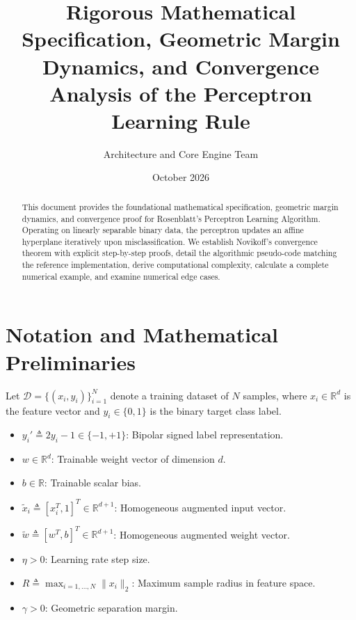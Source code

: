 \documentclass[11pt,a4paper]{article}
\title{\textbf{Rigorous Mathematical Specification, Geometric Margin Dynamics, and Convergence Analysis of the Perceptron Learning Rule}}
\author{Architecture and Core Engine Team}
\date{October 2026}
\theoremstyle{definition}
\begin{document}
\maketitle

\begin{abstract}
This document provides the foundational mathematical specification, geometric margin dynamics, and convergence proof for Rosenblatt's Perceptron Learning Algorithm. Operating on linearly separable binary data, the perceptron updates an affine hyperplane iteratively upon misclassification. We establish Novikoff's convergence theorem with explicit step-by-step proofs, detail the algorithmic pseudo-code matching the reference implementation, derive computational complexity, calculate a complete numerical example, and examine numerical edge cases.
\end{abstract}

\section{Notation and Mathematical Preliminaries}

Let $\mathcal{D} = \{(x_i, y_i)\}_{i=1}^N$ denote a training dataset of $N$ samples, where $x_i \in \mathbb{R}^d$ is the feature vector and $y_i \in \{0, 1\}$ is the binary target class label.

\begin{itemize}
    \item $y_i' \triangleq 2y_i - 1 \in \{-1, +1\}$: Bipolar signed label representation.
    \item $w \in \mathbb{R}^d$: Trainable weight vector of dimension $d$.
    \item $b \in \mathbb{R}$: Trainable scalar bias.
    \item $\tilde{x}_i \triangleq [x_i^T, 1]^T \in \mathbb{R}^{d+1}$: Homogeneous augmented input vector.
    \item $\tilde{w} \triangleq [w^T, b]^T \in \mathbb{R}^{d+1}$: Homogeneous augmented weight vector.
    \item $\eta > 0$: Learning rate step size.
    \item $R \triangleq \max_{i=1, \dots, N} \|x_i\|_2$: Maximum sample radius in feature space.
    \item $\gamma > 0$: Geometric separation margin.
\end{itemize}
\end{document}
